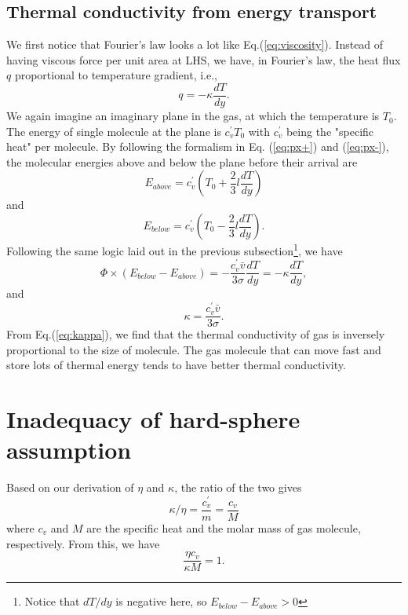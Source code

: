 \subsection{Thermal conductivity from energy transport}
We first notice that Fourier's law looks a lot like Eq.(\ref{eq:viscosity}). Instead of having viscous force per unit area at LHS, we have, in Fourier's law, the heat flux $ q $ proportional to temperature gradient, i.e.,
\begin{equation}
	q = -\kappa\frac{dT}{dy}.
	\label{eq:fourier}
\end{equation}
We again imagine an imaginary plane in the gas, at which the temperature is $ T_0 $. The energy of single molecule at the plane is $ c_v^{\prime}T_0 $ with $ c_v^{\prime} $ being the "specific heat" per molecule. By following the formalism in Eq. (\ref{eq:px+}) and (\ref{eq:px-}), the molecular energies above and below the plane before their arrival are
\begin{equation}
	E_{above} = c_v^{\prime}(T_0+\frac{2}{3}l\frac{dT}{dy})
\end{equation}
and
\begin{equation}
	E_{below} = c_v^{\prime}(T_0-\frac{2}{3}l\frac{dT}{dy}).
\end{equation}
Following the same logic laid out in the previous subsection\footnote{Notice that $ dT/dy $ is negative here, so $ E_{below}-E_{above}>0 $}, we have
\begin{equation}
	\Phi\times(E_{below}-E_{above}) = -\frac{c_v^{\prime}\bar{v}}{3\sigma}\frac{dT}{dy} = -\kappa\frac{dT}{dy},
\end{equation}
and
\begin{equation}
	\kappa = \frac{c_v^{\prime}\bar{v}}{3\sigma}.
	\label{eq:kappa}
\end{equation}
From Eq.(\ref{eq:kappa}), we find that the thermal conductivity of gas is inversely proportional to the size of molecule. The gas molecule that can move fast and store lots of thermal energy tends to have better thermal conductivity.
\section{Inadequacy of hard-sphere assumption}
Based on our derivation of $ \eta $ and $ \kappa $, the ratio of the two gives
\begin{equation}
	\kappa/\eta = \frac{c_v^{\prime}}{m} = \frac{c_v}{M}
\end{equation} 
where $ c_v $ and $ M $ are the specific heat and the molar mass of gas molecule, respectively. From this, we have
 \begin{equation}
 	\frac{\eta c_v}{\kappa M}=1.
 	\label{eq:unity-eta-kapp}
 \end{equation} 


